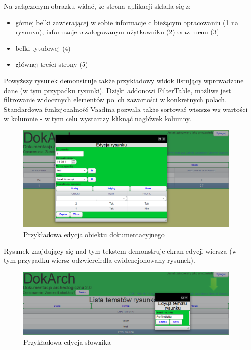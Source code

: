 Na załączonym obrazku widać, że strona aplikacji składa się z:
\begin{itemize}
\item górnej belki zawierającej w sobie informacje o bieżącym opracowaniu (1 na rysunku), informacje o zalogowanym użytkowniku (2) oraz menu (3)
\item belki tytułowej (4)
\item głównej treści strony (5) 
\end{itemize}

Powyższy rysunek demonstruje także przykładowy widok listujący wprowadzone dane (w tym przypadku rysunki). Dzięki addonowi FilterTable, możliwe jest filtrowanie widocznych elementów po ich zawartości w konkretnych polach. Standardowa funkcjonalność Vaadina pozwala także sortować wiersze wg wartości w kolumnie - w tym celu wystarczy kliknąć nagłówek kolumny.

\begin{figure} [H]
    \begin{center}
	\includegraphics[scale=.6]{img/edycja.png}
	\caption{Przykładowa edycja obiektu dokumentacyjnego}
	\label{edycjaPrzyklad}
    \end{center}
\end{figure}

\newpage
Rysunek znajdujący się nad tym tekstem demonstruje ekran edycji wiersza (w tym przypadku wiersz odzwierciedla ewidencjonowany rysunek). 

\begin{figure} [H]
    \begin{center}
	\includegraphics[scale=.6]{img/edycjaSlownika.png}
	\caption{Przykładowa edycja słownika}
	\label{edycjaSlownika}
    \end{center}
\end{figure}

